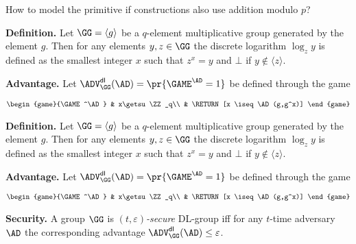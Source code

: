 \documentclass[landscape,footrule]{foils}
\begin{document}
How to model the primitive  if  constructions also use addition modulo $p$?



\textbf{Definition.} Let $\GG=\langle g\rangle$ be a $q$-element
multiplicative group generated by the element $g$. Then for any
elements $y,z\in\GG$ the discrete logarithm $\log_z y$ is defined as
the smallest integer $x$ such that $z^x=y$ and $\bot$ if
$y\notin\langle z\rangle$.  \bigskip

\textbf{Advantage.} Let $\advDLXX{\GG}{\AD}=\pr{\GAME^\AD=1}$ be defined through the game
\begin{small}
\begin{align*}
  \begin{game}{\GAME^\AD}
   & x\getsu\ZZ_q\\
   & \RETURN [x \iseq \AD(g,g^x)]
  \end{game}
\end{align*}%
\end{small}


\textbf{Definition.} Let $\GG=\langle g\rangle$ be a $q$-element
multiplicative group generated by the element $g$. Then for any
elements $y,z\in\GG$ the discrete logarithm $\log_z y$ is defined as
the smallest integer $x$ such that $z^x=y$ and $\bot$ if
$y\notin\langle z\rangle$.  \bigskip

\textbf{Advantage.} Let $\advDLXX{\GG}{\AD}=\pr{\GAME^\AD=1}$ be defined through the game
\begin{small}
\begin{align*}
  \begin{game}{\GAME^\AD}
   & x\getsu\ZZ_q\\
   & \RETURN [x \iseq \AD(g,g^x)]
  \end{game}
\end{align*}%
\end{small}

\textbf{Security.} A group $\GG$ is \emph{$(t,\varepsilon)$-secure}
DL-group iff for any $t$-time adversary $\AD$ the corresponding
advantage $\advDLXX{\GG}{\AD}\leq\varepsilon$.



\end{document}
